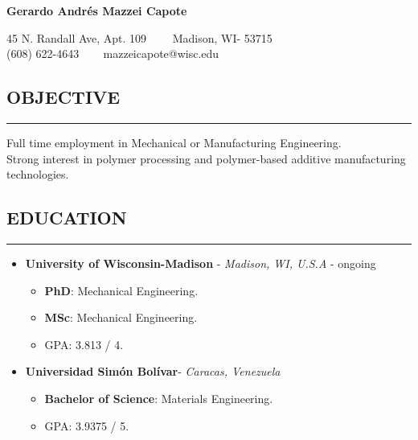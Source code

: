 \documentclass[11pt,letterpaper]{article}
\newenvironment{indentsection}[1]%
{\begin{list}{}%
	{\setlength{\leftmargin}{#1}}%
	\item[]%
}
{\end{list}}
\begin{document}
	\thispagestyle{firststyle}
	
\begin{center}
	{\LARGE \textbf{Gerardo Andrés Mazzei Capote}}

	45 N. Randall Ave, Apt. 109\ \ \textbullet
	\ \ Madison, WI- 53715
	\\
	(608) 622-4643 \ \textbullet
	\ \ mazzeicapote@wisc.edu
\end{center}

\vspace{-1em}

\subsection*{OBJECTIVE}
	\vspace{-0.5em}
	\hrule
	\vspace{0.4em}
	\begin{indentsection}{\parindent}
		Full time employment in Mechanical or Manufacturing Engineering.\\
		Strong interest in polymer processing and polymer-based additive manufacturing technologies.
	\end{indentsection}


\subsection*{EDUCATION}
	\vspace{-0.5em}
	\hrule
	\vspace{0.4em}
	\begin{itemize}
	\item
	\textbf{University of Wisconsin-Madison} - \emph{Madison, WI, U.S.A} - ongoing
	\begin{itemize}	
	\item
	\textbf{PhD}: Mechanical Engineering. 
	\item
	\textbf{MSc}: Mechanical Engineering.
	\item
	GPA: 3.813 / 4.
\end{itemize}

	\item
	\textbf{Universidad Simón Bolívar}- \emph{Caracas, Venezuela}
	\begin{itemize}	
		\item
		\textbf{Bachelor of Science}: Materials Engineering. 
		\item
		GPA: 3.9375 / 5.
	\end{itemize}
	\end{itemize}
\end{document}
